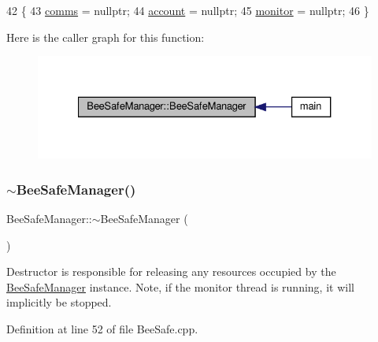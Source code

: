 \begin{DoxyCode}
42 \{
43     \hyperlink{class_bee_safe_manager_a80b19afbb679d08be14d67a45447f9e1}{comms} = \textcolor{keyword}{nullptr};
44     \hyperlink{class_bee_safe_manager_a52bc9bc8c1ea9608b83d603b142443b0}{account} = \textcolor{keyword}{nullptr};
45     \hyperlink{class_bee_safe_manager_a3b885b4fb364228c914095f2e670f9af}{monitor} = \textcolor{keyword}{nullptr};
46 \}
\end{DoxyCode}
Here is the caller graph for this function\+:\nopagebreak
\begin{figure}[H]
\begin{center}
\leavevmode
\includegraphics[width=327pt]{d5/d75/class_bee_safe_manager_a4a897d6317bdc548fb235d0cdb2877b1_icgraph}
\end{center}
\end{figure}
\mbox{\label{class_bee_safe_manager_ac99fb148bcac3aa3f51e96fdf7bc0c1b}} 
\subsubsection{\texorpdfstring{$\sim$\+Bee\+Safe\+Manager()}{~BeeSafeManager()}}
{\footnotesize\ttfamily Bee\+Safe\+Manager\+::$\sim$\+Bee\+Safe\+Manager (\begin{DoxyParamCaption}{ }\end{DoxyParamCaption})}

Destructor is responsible for releasing any resources occupied by the \hyperlink{class_bee_safe_manager}{Bee\+Safe\+Manager} instance. Note, if the monitor thread is running, it will implicitly be stopped. 

Definition at line 52 of file Bee\+Safe.\+cpp.



